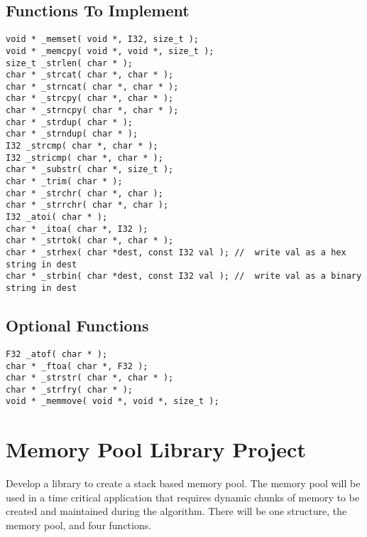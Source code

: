\documentclass[a4paper,12pt]{report}
\begin{document}
\subsection*{Functions To Implement}
\begin{lstlisting}
void * _memset( void *, I32, size_t );
void * _memcpy( void *, void *, size_t );
size_t _strlen( char * );
char * _strcat( char *, char * );
char * _strncat( char *, char * );
char * _strcpy( char *, char * );
char * _strncpy( char *, char * );
char * _strdup( char * );
char * _strndup( char * );
I32 _strcmp( char *, char * );
I32 _stricmp( char *, char * );
char * _substr( char *, size_t );
char * _trim( char * );
char * _strchr( char *, char );
char * _strrchr( char *, char );
I32 _atoi( char * );
char * _itoa( char *, I32 );
char * _strtok( char *, char * );
char * _strhex( char *dest, const I32 val ); //  write val as a hex string in dest
char * _strbin( char *dest, const I32 val ); //  write val as a binary string in dest
\end{lstlisting}

\subsection*{Optional Functions}
\begin{lstlisting}
F32 _atof( char * );
char * _ftoa( char *, F32 );
char * _strstr( char *, char * );
char * _strfry( char * ); 
void * _memmove( void *, void *, size_t );
\end{lstlisting}

\pagebreak
\section*{Memory Pool Library Project}
Develop a library to create a stack based memory pool.  The memory pool will be used in a time critical application that requires dynamic chunks of memory to be created and maintained during the algorithm.  There will be one structure, the memory pool, and four functions.
\end{document}

